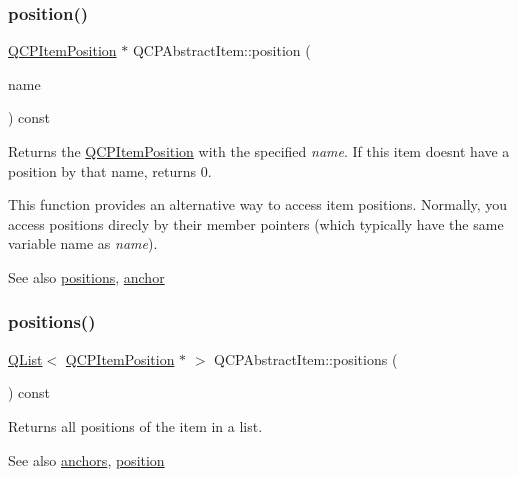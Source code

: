 \subsubsection{\texorpdfstring{position()}{position()}}
{\footnotesize\ttfamily \hyperlink{class_q_c_p_item_position}{Q\+C\+P\+Item\+Position} $\ast$ Q\+C\+P\+Abstract\+Item\+::position (\begin{DoxyParamCaption}\item[{const Q\+String \&}]{name }\end{DoxyParamCaption}) const}

Returns the \hyperlink{class_q_c_p_item_position}{Q\+C\+P\+Item\+Position} with the specified {\itshape name}. If this item doesn\textquotesingle{}t have a position by that name, returns 0.

This function provides an alternative way to access item positions. Normally, you access positions direcly by their member pointers (which typically have the same variable name as {\itshape name}).

\begin{DoxySeeAlso}{See also}
\hyperlink{class_q_c_p_abstract_item_a709f655ac3f7f22d452714134662b454}{positions}, \hyperlink{class_q_c_p_abstract_item_a139c255ea8831642fac91748e29a5adb}{anchor} 
\end{DoxySeeAlso}
\mbox{\label{class_q_c_p_abstract_item_a709f655ac3f7f22d452714134662b454}} 
\subsubsection{\texorpdfstring{positions()}{positions()}}
{\footnotesize\ttfamily \hyperlink{class_q_list}{Q\+List}$<$ \hyperlink{class_q_c_p_item_position}{Q\+C\+P\+Item\+Position} $\ast$ $>$ Q\+C\+P\+Abstract\+Item\+::positions (\begin{DoxyParamCaption}{ }\end{DoxyParamCaption}) const\hspace{0.3cm}{\ttfamily [inline]}}

Returns all positions of the item in a list.

\begin{DoxySeeAlso}{See also}
\hyperlink{class_q_c_p_abstract_item_a81d1ecfea3368b836cf9675a0045e659}{anchors}, \hyperlink{class_q_c_p_abstract_item_a2589c3d298f9a576d77d9addb440a18d}{position} 
\end{DoxySeeAlso}
\mbox{\label{class_q_c_p_abstract_item_aa5cffb034fc65dbb91c77e02c1c14251}} 
